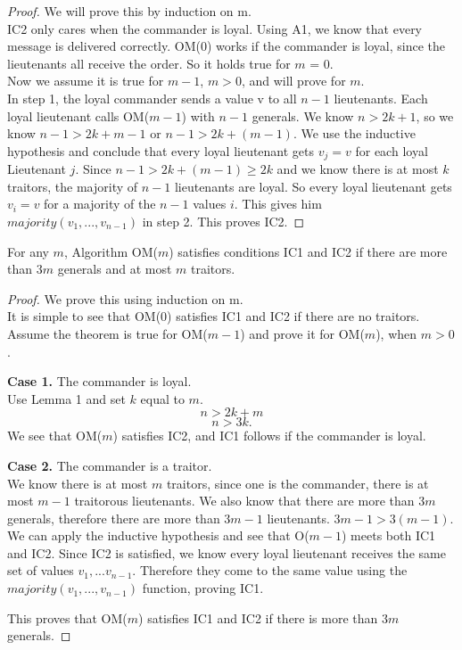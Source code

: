 \documentclass[10pt]{amsart}
\begin{document}
\begin{proof}
    We will prove this by induction on m. \\
    IC2 only cares when the commander is loyal. Using A1, we know that every message is delivered
    correctly. OM(0) works if the commander is loyal, since the lieutenants all receive the order. So
    it holds true for $m$ = 0. \\
    Now we assume it is true for $m-1$, $m>0$, and will prove for $m$. \\
    In step 1, the loyal commander sends a value v to all $n-1$ lieutenants. Each loyal lieutenant calls
    OM($m-1$) with $n-1$ generals. We know $n>2k+1$, so we know $n-1>2k+m-1$ or $n-1>2k+(m-1)$. We use the inductive
    hypothesis and conclude that every loyal lieutenant gets $v_j=v$ for each loyal Lieutenant $j$. Since
    $n-1>2k+(m-1)\geq2k$ and we know there is at most $k$ traitors, the majority of $n-1$ lieutenants are loyal.
    So every loyal lieutenant gets $v_i=v$ for a majority of the $n-1$ values $i$. This gives him 
    $majority(v_1,...,v_{n-1})$ in step 2. This proves IC2.
\end{proof}

\begin{theorem}
    \label{theorem1}
    For any $m$, Algorithm OM($m$) satisfies conditions IC1 and IC2 if there are more than $3m$ generals 
    and at most $m$ traitors.
\end{theorem}

\begin{proof}
    We prove this using induction on m. \\
    It is simple to see that OM(0) satisfies IC1 and IC2 if there are no traitors.
    Assume the theorem is true for OM($m-1$) and prove it for OM($m$), when $m>0$.

    \begin{minipage}{.8\textwidth}%
        \textbf{Case 1.} The commander is loyal. \\
        Use Lemma 1 and set $k$ equal to $m$.
        \[ n > 2k + m \] 
        \[ n > 3k. \]
        We see that OM($m$) satisfies IC2, and IC1 follows if the commander is loyal.
    \end{minipage}%

    \begin{minipage}{.8\textwidth}%
        \textbf{Case 2.} The commander is a traitor. \\
        We know there is at most $m$ traitors, since one is the commander, there is at most $m-1$
        traitorous lieutenants. We also know that there are more than $3m$ generals, therefore there
        are more than $3m-1$ lieutenants. $3m-1 > 3(m-1)$. We can apply the inductive hypothesis and
        see that O($m-1$) meets both IC1 and IC2. Since IC2 is satisfied, we know every loyal
        lieutenant receives the same set of values $v_1,...v_{n-1}$. Therefore they come to the same
        value using the $majority(v_1,...,v_{n-1})$ function, proving IC1.
    \end{minipage}%

    This proves that OM($m$) satisfies IC1 and IC2 if there is more than $3m$ generals.
\end{proof}
\end{document}
